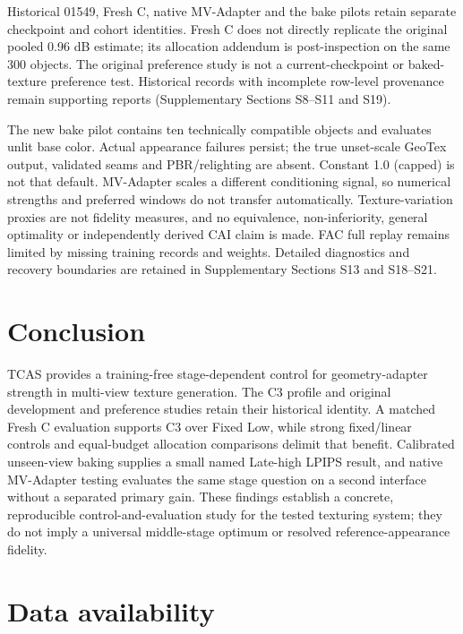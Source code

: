 \documentclass[times,twocolumn,final]{elsarticle}
\providecommand{\DIFadd}[1]{{\protect\color{blue} \sf #1}} %
\providecommand{\DIFaddbegin}{} %
\providecommand{\DIFaddend}{} %
\begin{document}
 \DIFaddbegin \DIFadd{Historical 01549, Fresh C, native MV-Adapter and the bake pilots retain separate checkpoint and cohort identities. Fresh C does not directly replicate the original pooled 0.96 dB estimate; its allocation addendum is post-inspection on the same 300 objects. The original preference study is not a current-checkpoint }\DIFaddend or   \DIFaddbegin \DIFadd{baked-texture preference test. Historical records with incomplete row-level provenance remain supporting reports (Supplementary Sections S8--S11 and S19).
}\DIFaddend 

  \DIFaddbegin \DIFadd{The new bake pilot contains ten technically compatible objects and evaluates unlit base color. Actual appearance failures persist; the true unset-scale GeoTex output, validated seams and PBR/relighting are absent. Constant 1.0 (capped) is not that default. MV-Adapter scales a different conditioning signal, so numerical strengths and preferred windows do not transfer automatically. Texture-variation proxies are not fidelity measures, and no equivalence, non-inferiority, general optimality or independently derived CAI claim is made. FAC full replay remains limited by missing training records and weights. Detailed diagnostics and recovery boundaries are retained in Supplementary Sections S13 and S18--S21}\DIFaddend .

\section{Conclusion}
\label{sec:conclusion}
 
 \DIFaddbegin \DIFadd{TCAS provides a training-free stage-dependent control for geometry-adapter strength }\DIFaddend in multi-view   texture generation. The  
 C3   \DIFaddbegin \DIFadd{profile and original development and preference studies retain their historical identity. A matched Fresh C evaluation supports }\DIFaddend C3  
 \DIFaddbegin \DIFadd{over Fixed Low, while strong fixed/linear controls and equal-budget allocation comparisons delimit that benefit. Calibrated unseen-view baking supplies a small named Late-high LPIPS result, }\DIFaddend and  
 \DIFaddbegin \DIFadd{native MV-Adapter testing evaluates the same stage question on a second interface without a separated primary gain. These findings establish a concrete, reproducible control-and-evaluation study for the tested texturing system; they do not imply a universal middle-stage optimum or resolved reference-appearance fidelity.
}\DIFaddend 

\section*{Data availability}
\end{document}
